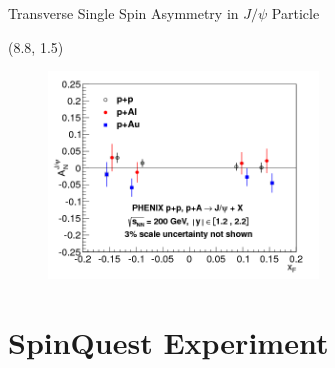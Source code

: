 \documentclass[10pt, xcolor={dvipsnames}, aspectratio = 169]{beamer}
\newcommand{\citeme}[1]{{\tiny \footfullcite{#1}}}
\newcommand{\jpsi}{$J/\psi$ }
\begin{document}
\begin{frame}{Transverse Single Spin Asymmetry in \jpsi Particle}

\begin{textblock}{7.0}(8.8, 1.5)

\begin{figure}
    \centering
    \includegraphics[height = 5.5cm]{imgs/final_xf.png}
\end{figure}

\end{textblock}

\end{frame}

%
%

\section{SpinQuest Experiment}
\end{document}
